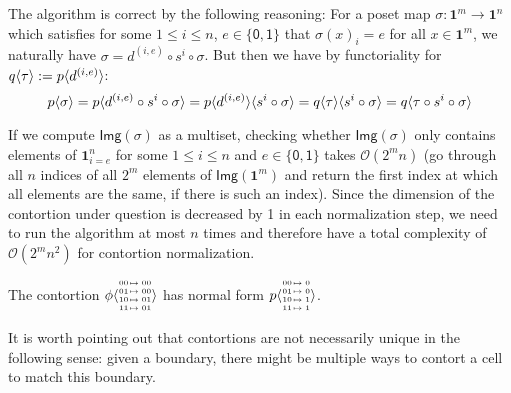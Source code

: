 \documentclass{llncs}
\newcommand{\continuation}{??}
\newenvironment{examplecontd}[1]
{\renewcommand{\continuation}{\ref{#1}}\expcont[continued]}
{\endexpcont}
\newcommand{\mdef}{:=}
\newcommand{\pint}[1]{\mathbf{1}^{#1}}
\newcommand{\pintrestr}[3]{\mathbf{1}^{#1}_{{#2}={#3}}}
\newcommand{\izero}{\mathsf{0}}
\newcommand{\ione}{\mathsf{1}}
\newcommand{\image}[1]{\textsf{Img}({#1})}
\newcommand{\smap}[1]{s^{{#1}}}
\newcommand{\dmap}[2]{d^{({#1} , {#2})}}
\newcommand{\cont}[2]{\ensuremath{ \ifthenelse{\equal{#2}{}}{#1}{{#1}\langle{#2}\rangle}} }
\newcommand{\substfour}[4]{\tiny
  \arraycolsep=.4pt\def\arraystretch{1}
  \begin{array}{ll}
    00 &\mapsto {#1} \\
    01 &\mapsto {#2} \\
    10 &\mapsto {#3} \\
    11 &\mapsto {#4} 
  \end{array}
}
\begin{document}
The algorithm is correct by the following reasoning: For a poset map $\sigma :
\pint{m} \to \pint{n}$ which satisfies for some $1 \leq i \leq n$, $e \in
\{\izero, \ione\}$ that $\sigma(x)_i = e$ for all $x \in \pint{m}$, we naturally
have $\sigma = \dmap{i}{e} \circ \smap{i} \circ \sigma$.
But then we have by functoriality for $\cont{q}{\tau} \mdef \cont{p}{\dmap{i}{e}}$:
$$\cont{p}{\sigma} = \cont{p}{\dmap{i}{e} \circ \smap{i} \circ \sigma} =
\cont{\cont{p}{\dmap{i}{e}}}{\smap{i} \circ \sigma} =
\cont{\cont{q}{\tau}}{\smap{i} \circ \sigma} = \cont{q}{\tau \circ \smap{i} \circ \sigma}$$


If we compute $\image{\sigma}$ as a multiset, checking whether 
$\image{\sigma}$ only contains elements of $\pintrestr{n}{i}{e}$ for
some $1 \leq i \leq n$ and $e \in \{\izero,\ione\}$ takes $\mathcal{O}(2^mn)$
(go through all $n$ indices of all $2^m$ elements of $\image{\pint{m}}$ and
return the first index at which all elements are the same, if there is such an index).
Since the dimension of the contortion under question is decreased by 1 in each
normalization step, we need to run the algorithm at most $n$ times and therefore
have a total complexity of $\mathcal{O}(2^mn^2)$ for contortion normalization.

\begin{examplecontd}{exp:triangle}
  The contortion $\cont{\phi}{\substfour{00}{00}{01}{01}}$ has normal form $\cont{p}{\substfour{0}{0}{1}{1}}$.
\end{examplecontd}

It is worth pointing out that contortions are not necessarily unique in the
following sense: given a boundary, there might be multiple ways to contort a
cell to match this boundary.



\end{document}
